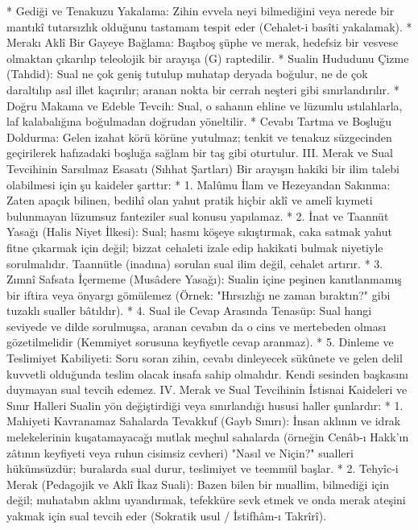 \documentclass[11pt,a4paper]{article}
\begin{document}
 * Gediği ve Tenakuzu Yakalama: Zihin evvela neyi bilmediğini veya nerede bir mantıkî tutarsızlık olduğunu tastamam tespit eder (Cehalet-i basîti yakalamak).
 * Merakı Aklî Bir Gayeye Bağlama: Başıboş şüphe ve merak, hedefsiz bir vesvese olmaktan çıkarılıp teleolojik bir arayışa (G) raptedilir.
 * Sualin Hududunu Çizme (Tahdid): Sual ne çok geniş tutulup muhatap deryada boğulur, ne de çok daraltılıp asıl illet kaçırılır; aranan nokta bir cerrah neşteri gibi sınırlandırılır.
 * Doğru Makama ve Edeble Tevcih: Sual, o sahanın ehline ve lüzumlu ıstılahlarla, laf kalabalığına boğulmadan doğrudan yöneltilir.
 * Cevabı Tartma ve Boşluğu Doldurma: Gelen izahat körü körüne yutulmaz; tenkit ve tenakuz süzgecinden geçirilerek hafızadaki boşluğa sağlam bir taş gibi oturtulur.
III. Merak ve Sual Tevcihinin Sarsılmaz Esasatı (Sıhhat Şartları)
Bir arayışın hakiki bir ilim talebi olabilmesi için şu kaideler şarttır:
 * 1. Malûmu İlam ve Hezeyandan Sakınma:
   Zaten apaçık bilinen, bedihî olan yahut pratik hiçbir aklî ve amelî kıymeti bulunmayan lüzumsuz fanteziler sual konusu yapılamaz.
 * 2. İnat ve Taannüt Yasağı (Halis Niyet İlkesi):
   Sual; hasmı köşeye sıkıştırmak, caka satmak yahut fitne çıkarmak için değil; bizzat cehaleti izale edip hakikati bulmak niyetiyle sorulmalıdır. Taannütle (inadına) sorulan sual ilim değil, cehalet artırır.
 * 3. Zımnî Safsata İçermeme (Musâdere Yasağı):
   Sualin içine peşinen kanıtlanmamış bir iftira veya önyargı gömülemez (Örnek: "Hırsızlığı ne zaman bıraktın?" gibi tuzaklı sualler bâtıldır).
 * 4. Sual ile Cevap Arasında Tenasüp:
   Sual hangi seviyede ve dilde sorulmuşsa, aranan cevabın da o cins ve mertebeden olması gözetilmelidir (Kemmiyet sorusuna keyfiyetle cevap aranmaz).
 * 5. Dinleme ve Teslimiyet Kabiliyeti:
   Soru soran zihin, cevabı dinleyecek sükûnete ve gelen delil kuvvetli olduğunda teslim olacak insafa sahip olmalıdır. Kendi sesinden başkasını duymayan sual tevcih edemez.
IV. Merak ve Sual Tevcihinin İstisnai Kaideleri ve Sınır Halleri
Sualin yön değiştirdiği veya sınırlandığı hususi haller şunlardır:
 * 1. Mahiyeti Kavranamaz Sahalarda Tevakkuf (Gayb Sınırı):
   İnsan aklının ve idrak melekelerinin kuşatamayacağı mutlak meçhul sahalarda (örneğin Cenâb-ı Hakk'ın zâtının keyfiyeti veya ruhun cisimsiz cevheri) "Nasıl ve Niçin?" sualleri hükümsüzdür; buralarda sual durur, teslimiyet ve teemmül başlar.
 * 2. Tehyîc-i Merak (Pedagojik ve Aklî İkaz Suali):
   Bazen bilen bir muallim, bilmediği için değil; muhatabın aklını uyandırmak, tefekküre sevk etmek ve onda merak ateşini yakmak için sual tevcih eder (Sokratik usul / İstifhâm-ı Takrîrî).
\end{document}
